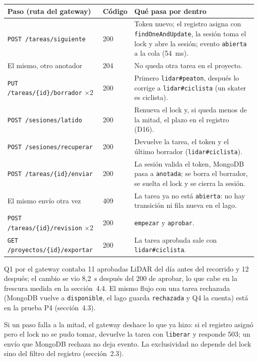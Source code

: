 \documentclass[10pt,letterpaper]{article}
\begin{document}
\begin{center}\footnotesize
\begin{tabular}{@{}>{\raggedright}p{}>{\raggedright}p{}>{\raggedright\arraybackslash}p{}@{}}
\toprule
Paso (ruta del gateway) & Código & Qué pasa por dentro \\
\midrule
\texttt{POST /tareas/siguiente} & 200 & Token nuevo; el registro asigna con \texttt{findOneAndUpdate}, la sesión toma el lock y abre la sesión; evento \texttt{abierta} a la cola (54~ms). \\
El mismo, otro anotador & 204 & No queda otra tarea en el proyecto. \\
\texttt{PUT /tareas/\{id\}/borrador} $\times 2$ & 200 & Primero \texttt{lidar\#peaton}, después lo corrige a \texttt{lidar\#ciclista} (un skater es ciclista). \\
\texttt{POST /sesiones/latido} & 200 & Renueva el lock y, si queda menos de la mitad, el plazo en el registro (D16). \\
\texttt{POST /sesiones/recuperar} & 200 & Devuelve la tarea, el token y el último borrador (\texttt{lidar\#ciclista}). \\
\texttt{POST /tareas/\{id\}/enviar} & 200 & La sesión valida el token, MongoDB pasa a \texttt{anotada}; se borra el borrador, se suelta el lock y se cierra la sesión. \\
El mismo envío otra vez & 409 & La tarea ya no está \texttt{abierta}: no hay transición ni fila nueva en el lago. \\
\texttt{POST /tareas/\{id\}/revision} $\times 2$ & 200 & \texttt{empezar} y \texttt{aprobar}. \\
\texttt{GET /proyectos/\{id\}/exportar} & 200 & La tarea aprobada sale con \texttt{lidar\#ciclista}. \\
\bottomrule
\end{tabular}
\end{center}

Q1 por el gateway contaba 11 aprobadas LiDAR del día antes del recorrido y 12 después; el cambio se vio
8,2~s después del 200 de aprobar, lo que cabe en la frescura medida en la sección~4.4. El mismo flujo con
una tarea rechazada (MongoDB vuelve a \texttt{disponible}, el lago guarda \texttt{rechazada} y Q4 la cuenta)
está en la prueba P4 (sección~4.3).

Si un paso falla a la mitad, el gateway deshace lo que ya hizo: si el registro asignó pero el lock no se
pudo tomar, devuelve la tarea con \texttt{liberar} y responde 503; un envío que MongoDB rechaza no deja
evento. La exclusividad no depende del lock sino del filtro del registro (sección~2.3).
\end{document}
